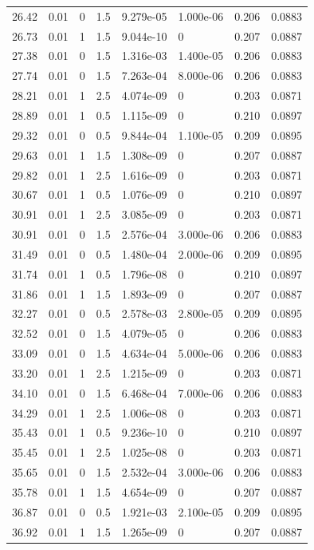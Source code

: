 \documentclass[preview]{standalone}
\begin{document}
{{{\begin{tabular}{L{1.2cm}C{1.2cm} C{0.3cm}C{0.5cm} C{1.4cm}C{1.4cm} C{1.4cm}C{1.4cm}}
  26.42  &  0.01  & 0     & 1.5 &  9.279e-05  & 1.000e-06  & 0.206 &  0.0883   \\ 
  26.73  &  0.01  & 1     & 1.5 &  9.044e-10  & 0  & 0.207 &  0.0887   \\ 
  27.38  &  0.01  & 0     & 1.5 &  1.316e-03  & 1.400e-05  & 0.206 &  0.0883   \\ 
  27.74  &  0.01  & 0     & 1.5 &  7.263e-04  & 8.000e-06  & 0.206 &  0.0883   \\ 
  28.21  &  0.01  & 1     & 2.5 &  4.074e-09  & 0  & 0.203 &  0.0871   \\ 
  28.89  &  0.01  & 1     & 0.5 &  1.115e-09  & 0  & 0.210 &  0.0897   \\ 
  29.32  &  0.01  & 0     & 0.5 &  9.844e-04  & 1.100e-05  & 0.209 &  0.0895   \\ 
  29.63  &  0.01  & 1     & 1.5 &  1.308e-09  & 0  & 0.207 &  0.0887   \\ 
  29.82  &  0.01  & 1     & 2.5 &  1.616e-09  & 0  & 0.203 &  0.0871   \\ 
  30.67  &  0.01  & 1     & 0.5 &  1.076e-09  & 0  & 0.210 &  0.0897   \\ 
  30.91  &  0.01  & 1     & 2.5 &  3.085e-09  & 0  & 0.203 &  0.0871   \\ 
  30.91  &  0.01  & 0     & 1.5 &  2.576e-04  & 3.000e-06  & 0.206 &  0.0883   \\ 
  31.49  &  0.01  & 0     & 0.5 &  1.480e-04  & 2.000e-06  & 0.209 &  0.0895   \\ 
  31.74  &  0.01  & 1     & 0.5 &  1.796e-08  & 0  & 0.210 &  0.0897   \\ 
  31.86  &  0.01  & 1     & 1.5 &  1.893e-09  & 0  & 0.207 &  0.0887   \\ 
  32.27  &  0.01  & 0     & 0.5 &  2.578e-03  & 2.800e-05  & 0.209 &  0.0895   \\ 
  32.52  &  0.01  & 0     & 1.5 &  4.079e-05  & 0  & 0.206 &  0.0883   \\ 
  33.09  &  0.01  & 0     & 1.5 &  4.634e-04  & 5.000e-06  & 0.206 &  0.0883   \\ 
  33.20  &  0.01  & 1     & 2.5 &  1.215e-09  & 0  & 0.203 &  0.0871   \\ 
  34.10  &  0.01  & 0     & 1.5 &  6.468e-04  & 7.000e-06  & 0.206 &  0.0883   \\ 
  34.29  &  0.01  & 1     & 2.5 &  1.006e-08  & 0  & 0.203 &  0.0871   \\ 
  35.43  &  0.01  & 1     & 0.5 &  9.236e-10  & 0  & 0.210 &  0.0897   \\ 
  35.45  &  0.01  & 1     & 2.5 &  1.025e-08  & 0  & 0.203 &  0.0871   \\ 
  35.65  &  0.01  & 0     & 1.5 &  2.532e-04  & 3.000e-06  & 0.206 &  0.0883   \\ 
  35.78  &  0.01  & 1     & 1.5 &  4.654e-09  & 0  & 0.207 &  0.0887   \\ 
  36.87  &  0.01  & 0     & 0.5 &  1.921e-03  & 2.100e-05  & 0.209 &  0.0895   \\ 
  36.92  &  0.01  & 1     & 1.5 &  1.265e-09  & 0  & 0.207 &  0.0887   \\ 
\hline 
\end{tabular} 

}}}
\end{document}
